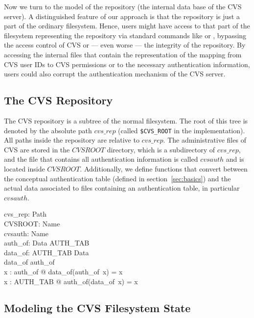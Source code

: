 Now we turn to the model of the repository (the internal data base of the CVS
server). A distinguished feature of our approach is that the repository is just
a part of the ordinary filesystem.  Hence, users might have access to that part
of the filesystem representing the repository via standard \unix{} commands like
 or , bypassing the access control of CVS or --- even
worse --- the integrity of the repository. By accessing the internal files that
contain the representation of the mapping from CVS user IDs to CVS permissions
or to the necessary authentication information, users could also corrupt the
authentication mechanism of the CVS server.


\subsection{The CVS Repository}\label{sec:cvs-repository}

The CVS repository is a subtree of the normal filesystem.  The root of this tree
is denoted by the absolute path $cvs\_rep$ (called \texttt{\$CVS\_ROOT} in the
implementation).  All paths inside the repository are relative to $cvs\_rep$.
The administrative files of CVS are stored in the $CVSROOT$ directory, which is
a subdirectory of $cvs\_rep$, and the file that contains all authentication
information is called $cvsauth$ and is located inside $CVSROOT$.  Additionally,
we define functions that convert between the conceptual authentication table
(defined in section~\ref{sec:basics}) and the actual data associated to files
containing an authentication table, in particular $cvsauth$.
\begin{doc}{6}
  \begin{axdef}
    cvs\_rep: Path \\
    CVSROOT: Name \\
    cvsauth: Name \\
    auth\_of: Data \pfun AUTH\_TAB\\
    data\_of: AUTH\_TAB \fun Data\\
    \where 
    \ran data\_of \subseteq \dom auth\_of \\
    \forall x : \dom auth\_of @ data\_of(auth\_of~x) = x \\
    \forall x : AUTH\_TAB @ auth\_of(data\_of~x) = x \\
  \end{axdef}
\end{doc}


\subsection{Modeling the CVS Filesystem State}

